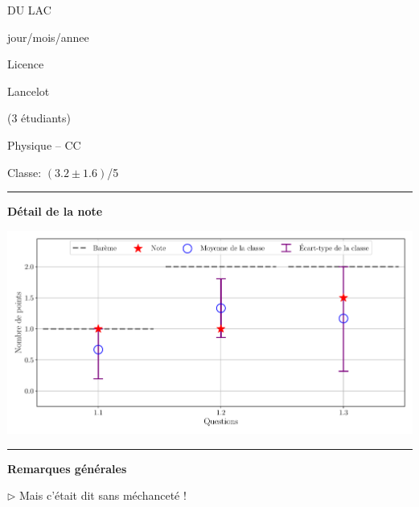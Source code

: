 \documentclass[12pt, a4paper]{article}
\begin{document}
\pagestyle{empty}
\noindent\begin{minipage}[c]{0.31\linewidth}\noindent DU LAC\end{minipage}\hfill
\begin{minipage}[c]{0.31\linewidth}\centering jour/mois/annee \end{minipage}\hfill
\begin{minipage}[c]{0.31\linewidth}\hfill Licence \end{minipage}\hfill

\noindent\begin{minipage}[c]{0.31\linewidth}\noindent Lancelot\end{minipage}\hfill
\begin{minipage}[c]{0.31\linewidth}\hfill(3 étudiants)\end{minipage}
\begin{center} Physique -- CC\bigskip

{\Large\bf {}}\end{center}

\vspace*{-0.7cm}\hfill Classe:  $\left(3.2 \pm 1.6\right)$/5
\noindent\rule{\linewidth}{.7pt}\begin{center}{\large\bf Détail de la note}\end{center}

\begin{center}
\includegraphics[keepaspectratio, width=\linewidth]{./output/DU LAC_Lancelot_GradeStats.pdf}\end{center}


\noindent\rule{\linewidth}{.7pt}\begin{center}{\large\bf Remarques générales}\end{center}

$\triangleright$\xspace Mais c’était dit sans méchanceté !
\end{document}
